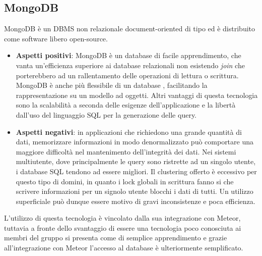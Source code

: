 \subsection{MongoDB}\label{MongoDB}
MongoDB è un DBMS non relazionale document-oriented di tipo  ed è distribuito come software libero open-source. 
\begin{itemize}
	\item \textbf{Aspetti positivi}: MongoDB è un database di facile apprendimento, che vanta un'efficienza superiore ai database relazionali non esistendo \textit{join} che porterebbero ad un rallentamento delle operazioni di lettura o scrittura. MongoDB è anche più flessibile di un database , facilitando la rappresentazione su un modello ad oggetti. Altri vantaggi di questa tecnologia sono la scalabilità a seconda delle esigenze dell'applicazione e la libertà dall'uso del linguaggio SQL per la generazione delle query.
	\item \textbf{Aspetti negativi}: in applicazioni che richiedono una grande quantità di dati, memorizzare informazioni in modo denormalizzato può comportare una maggiore difficoltà nel mantenimento dell'integrità dei dati. Nei sistemi multiutente, dove principalmente le query sono ristrette ad un singolo utente, i database SQL tendono ad essere migliori. Il clustering offerto è eccessivo per questo tipo di domini, in quanto i lock globali in scrittura fanno si che scrivere informazioni per un signolo utente blocchi i dati di tutti. Un utilizzo superficiale può dunque essere motivo di gravi inconsistenze e poca efficienza.
\end{itemize}
L'utilizzo di questa tecnologia è vincolato dalla sua integrazione con Meteor, tuttavia a fronte dello svantaggio di essere una tecnologia poco conosciuta ai membri del gruppo si presenta come di semplice apprendimento e grazie all'integrazione con Meteor l'accesso al database è ulteriormente semplificato.

